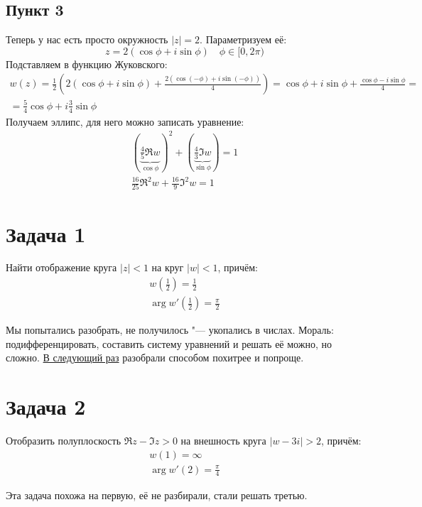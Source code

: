 	\subsection{Пункт 3}
		Теперь у нас есть просто окружность $|z|=2$.
		Параметризуем её:
		\[ z = 2(\cos \phi + i\sin \phi) \quad \phi \in [0, 2\pi) \]
		Подставляем в функцию Жуковского:
		\begin{gather*}
			w(z) =
				\frac12\left(2(\cos\phi + i\sin\phi) + \frac{2(\cos(-\phi) + i\sin(-\phi))}{4}\right) =
				\cos\phi + i\sin\phi + \frac{\cos\phi - i\sin\phi}{4} = \\
				= \frac54\cos\phi + i\frac34\sin\phi
		\end{gather*}
		Получаем эллипс, для него можно записать уравнение:
		\begin{gather*}
			\left(\underbrace{\frac45 \Re w}_{\cos\phi}\right)^2 + \left(\underbrace{\frac 43 \Im w}_{\sin\phi}\right) = 1 \\
			\frac{16}{25}\Re^2 w + \frac{16}{9}\Im^2 w = 1
		\end{gather*}

\section{Задача 1}\label{day160331_task1}
	Найти отображение круга $|z|<1$ на круг $|w|<1$, причём:
	\begin{gather*}
		w\left(\frac 12\right) = \frac12 \\
		\arg w'\left(\frac 12\right) = \frac \pi 2
	\end{gather*}

	Мы попытались разобрать, не получилось "--- укопались в числах.
	Мораль: подифференцировать, составить систему уравнений и решать её можно, но сложно.
	\hyperref[day160404_task1]{В следующий раз} разобрали способом похитрее и попроще.

\section{Задача 2}
	Отобразить полуплоскость $\Re z - \Im z > 0$ на внешность круга $|w-3i|>2$, причём:
	\begin{gather*}
		w(1) = \infty \\
		\arg w'(2) = \frac \pi 4
	\end{gather*}

	Эта задача похожа на первую, её не разбирали, стали решать третью.

